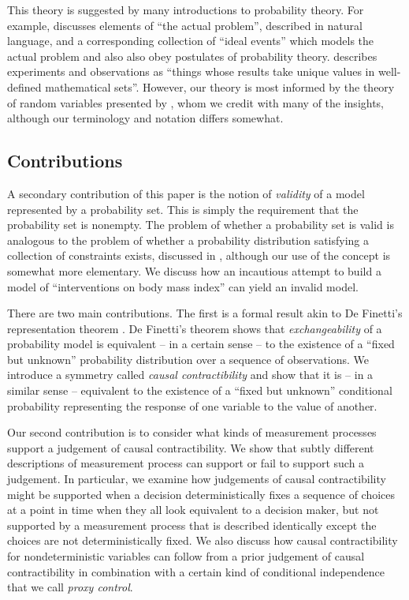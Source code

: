 \documentclass{article}
\theoremstyle{plain}
\theoremstyle{definition}
\begin{document}
This theory is suggested by many introductions to probability theory. For example, \citet{boole_theory_1862} discusses elements of ``the actual problem'', described in natural language, and a corresponding collection of ``ideal events'' which models the actual problem and also also obey postulates of probability theory. \citet{feller_introduction_1968} describes experiments and observations as ``things whose results take unique values in well-defined mathematical sets''. However, our theory is most informed by the theory of random variables presented by \citet{menger_random_2003}, whom we credit with many of the insights, although our terminology and notation differs somewhat.

\subsection{Contributions}

A secondary contribution of this paper is the notion of \emph{validity} of a model represented by a probability set. This is simply the requirement that the probability set is nonempty. The problem of whether a probability set is valid is analogous to the problem of whether a probability distribution satisfying a collection of constraints exists, discussed in \citet{vorobev_consistent_1962}, although our use of the concept is somewhat more elementary. We discuss how an incautious attempt to build a model of ``interventions on body mass index'' can yield an invalid model.

There are two main contributions. The first is a formal result akin to De Finetti's representation theorem \citep{de_finetti_foresight_1992}. De Finetti's theorem shows that \emph{exchangeability} of a probability model is equivalent -- in a certain sense -- to the existence of a ``fixed but unknown'' probability distribution over a sequence of observations. We introduce a symmetry called \emph{causal contractibility} and show that it is -- in a similar sense -- equivalent to the existence of a ``fixed but unknown'' conditional probability representing the response of one variable to the value of another.


Our second contribution is to consider what kinds of measurement processes support a judgement of causal contractibility. We show that subtly different descriptions of measurement process can support or fail to support such a judgement. In particular, we examine how judgements of causal contractibility might be supported when a decision deterministically fixes a sequence of choices at a point in time when they all look equivalent to a decision maker, but not supported by a measurement process that is described identically except the choices are not deterministically fixed. We also discuss how causal contractibility for nondeterministic variables can follow from a prior judgement of causal contractibility in combination with a certain kind of conditional independence that we call \emph{proxy control}.
\end{document}
